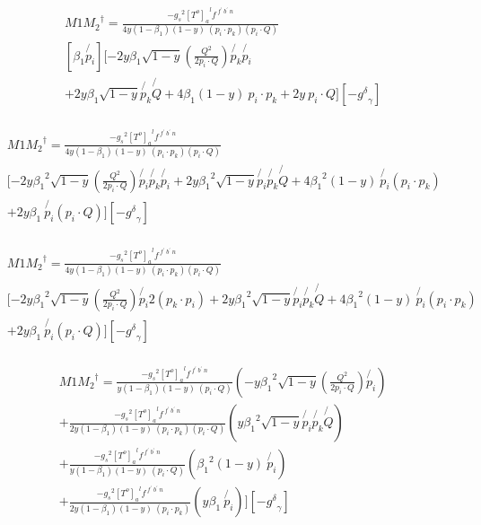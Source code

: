 \begin{equation}
\begin{split}
&M1{M_2}^{\dagger}=\frac{-{g_s}^2 {[T^{o}]_a}^{l} f^{\:f^{\prime}\: b^{\prime}\:n}}{4y(1-\beta_1) (1-y)\:(p_i \cdot p_k)(p_i \cdot Q)}\\
&[\beta_1\not{p_i} ][-2 y\beta_1\sqrt{1-y}(\frac{Q^2}{2p_i \cdot Q})\not{p_k}\not{p_i}\\
&+2y\beta_1\sqrt{1-y}\not{p_k}\not{Q}+4\beta_1 (1-y)\:p_i \cdot p_k+2 y\:p_i\cdot Q][-{g^{\delta}}_{\gamma}]\\
\end{split}
\end{equation}

\begin{equation}
\begin{split}
&M1{M_2}^{\dagger}=\frac{-{g_s}^2 {[T^{o}]_a}^{l} f^{\:f^{\prime}\: b^{\prime}\:n}}{4y(1-\beta_1) (1-y)\:(p_i \cdot p_k)(p_i \cdot Q)}\\
&[-2 y{\beta_1}^2 \sqrt{1-y}(\frac{Q^2}{2p_i \cdot Q})\not{p_i}\not{p_k}\not{p_i}+2y{\beta_1}^2 \sqrt{1-y}\not{p_i}\not{p_k}\not{Q}+4{\beta_1}^2 (1-y)\:\not{p_i}(p_i \cdot p_k)\\
&+2 y\beta_1\:\not{p_i}(p_i\cdot Q)][-{g^{\delta}}_{\gamma}]\\
\end{split}
\end{equation}

\begin{equation}
\begin{split}
&M1{M_2}^{\dagger}=\frac{-{g_s}^2 {[T^{o}]_a}^{l} f^{\:f^{\prime}\: b^{\prime}\:n}}{4y(1-\beta_1) (1-y)\:(p_i \cdot p_k)(p_i \cdot Q)}\\
&[-2 y{\beta_1}^2 \sqrt{1-y}(\frac{Q^2}{2p_i \cdot Q})\not{p_i}2({p_k}\cdot{p_i})+2y{\beta_1}^2 \sqrt{1-y}\not{p_i}\not{p_k}\not{Q}+4{\beta_1}^2 (1-y)\:\not{p_i}(p_i \cdot p_k)\\
&+2 y\beta_1\:\not{p_i}(p_i\cdot Q)][-{g^{\delta}}_{\gamma}]\\
\end{split}
\end{equation}

\begin{equation}
\begin{split}
&M1{M_2}^{\dagger}=\frac{-{g_s}^2 {[T^{o}]_a}^{l} f^{\:f^{\prime}\: b^{\prime}\:n}}{y(1-\beta_1) (1-y)\:(p_i \cdot Q)}(- y{\beta_1}^2 \sqrt{1-y}(\frac{Q^2}{2p_i \cdot Q})\not{p_i})\\
&+\frac{-{g_s}^2 {[T^{o}]_a}^{l} f^{\:f^{\prime}\: b^{\prime}\:n}}{2y(1-\beta_1) (1-y)\:(p_i \cdot p_k)(p_i \cdot Q)}(y{\beta_1}^2 \sqrt{1-y}\not{p_i}\not{p_k}\not{Q})\\
&+\frac{-{g_s}^2 {[T^{o}]_a}^{l} f^{\:f^{\prime}\: b^{\prime}\:n}}{y(1-\beta_1) (1-y)\:(p_i \cdot Q)}({\beta_1}^2 (1-y)\:\not{p_i})\\
&+\frac{-{g_s}^2 {[T^{o}]_a}^{l} f^{\:f^{\prime}\: b^{\prime}\:n}}{2y(1-\beta_1) (1-y)\:(p_i \cdot p_k)}(y\beta_1\:\not{p_i})][-{g^{\delta}}_{\gamma}]\\
\end{split}
\end{equation}

